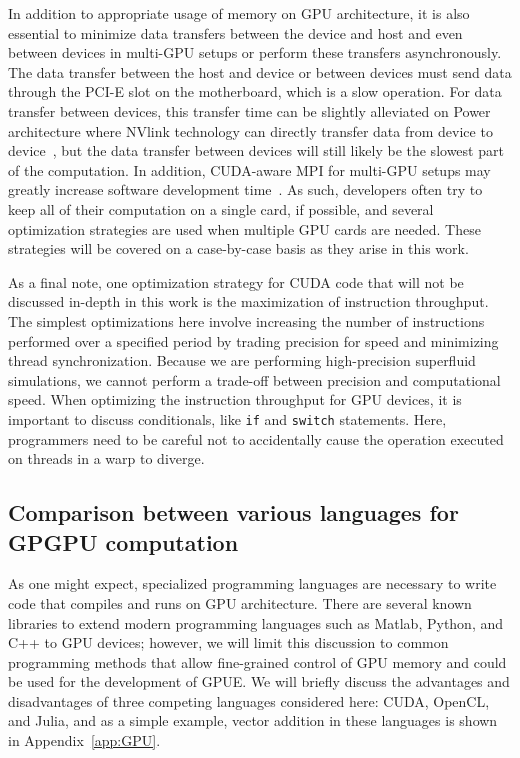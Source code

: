 In addition to appropriate usage of memory on GPU architecture, it is also essential to minimize data transfers between the device and host and even between devices in multi-GPU setups or perform these transfers asynchronously.
The data transfer between the host and device or between devices must send data through the PCI-E slot on the motherboard, which is a slow operation.
For data transfer between devices, this transfer time can be slightly alleviated on Power architecture where NVlink technology can directly transfer data from device to device~\cite{foley2017}, but the data transfer between devices will still likely be the slowest part of the computation.
In addition, CUDA-aware MPI for multi-GPU setups may greatly increase software development time~\cite{lonvcar2016, wang2013}.
As such, developers often try to keep all of their computation on a single card, if possible, and several optimization strategies are used when multiple GPU cards are needed.
These strategies will be covered on a case-by-case basis as they arise in this work.

As a final note, one optimization strategy for CUDA code that will not be discussed in-depth in this work is the maximization of instruction throughput.
The simplest optimizations here involve increasing the number of instructions performed over a specified period by trading precision for speed and minimizing thread synchronization.
Because we are performing high-precision superfluid simulations, we cannot perform a trade-off between precision and computational speed.
When optimizing the instruction throughput for GPU devices, it is important to discuss conditionals, like \texttt{if} and \texttt{switch} statements.
Here, programmers need to be careful not to accidentally cause the operation executed on threads in a warp to diverge.

\subsection{Comparison between various languages for GPGPU computation}
\label{sec:compare}

As one might expect, specialized programming languages are necessary to write code that compiles and runs on GPU architecture.
There are several known libraries to extend modern programming languages such as Matlab, Python, and C++ to GPU devices; however, we will limit this discussion to common programming methods that allow fine-grained control of GPU memory and could be used for the development of GPUE.
We will briefly discuss the advantages and disadvantages of three competing languages considered here: CUDA, OpenCL, and Julia, and as a simple example, vector addition in these languages is shown in  Appendix~\ref{app:GPU}.

